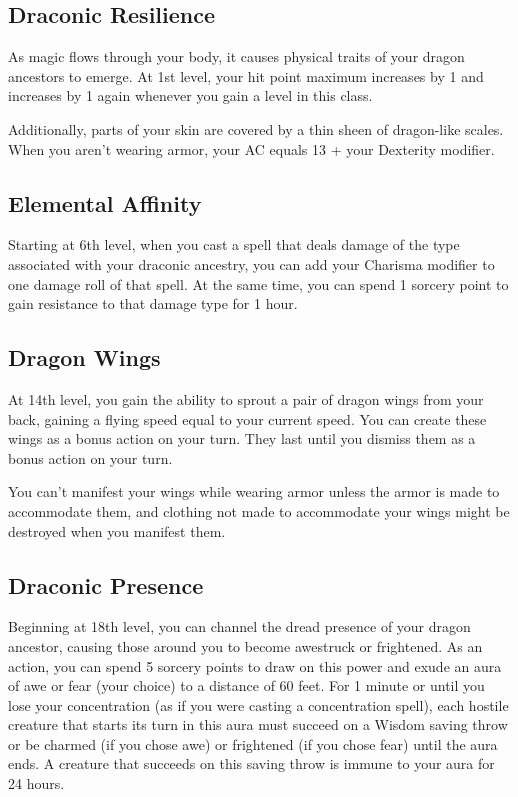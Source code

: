 \subsection{Draconic Resilience}

As magic flows through your body, it causes physical traits of your dragon ancestors to emerge. At 1st level, your hit point maximum increases by 1 and increases by 1 again whenever you gain a level in this class.

Additionally, parts of your skin are covered by a thin sheen of dragon-like scales. When you aren’t wearing armor, your AC equals 13 + your Dexterity modifier.

\subsection{Elemental Affinity}

Starting at 6th level, when you cast a spell that deals damage of the type associated with your draconic ancestry, you can add your Charisma modifier to one damage roll of that spell. At the same time, you can spend 1 sorcery point to gain resistance to that damage type for 1 hour.

\subsection{Dragon Wings}

At 14th level, you gain the ability to sprout a pair of dragon wings from your back, gaining a flying speed equal to your current speed. You can create these wings as a bonus action on your turn. They last until you dismiss them as a bonus action on your turn.

You can’t manifest your wings while wearing armor unless the armor is made to accommodate them, and clothing not made to accommodate your wings might be destroyed when you manifest them.

\subsection{Draconic Presence}

Beginning at 18th level, you can channel the dread presence of your dragon ancestor, causing those around you to become awestruck or frightened. As an action, you can spend 5 sorcery points to draw on this power and exude an aura of awe or fear (your choice) to a distance of 60 feet. For 1 minute or until you lose your concentration (as if you were casting a concentration spell), each hostile creature that starts its turn in this aura must succeed on a Wisdom saving throw or be charmed (if you chose awe) or frightened (if you chose fear) until the aura ends. A creature that succeeds on this saving throw is immune to your aura for 24 hours.